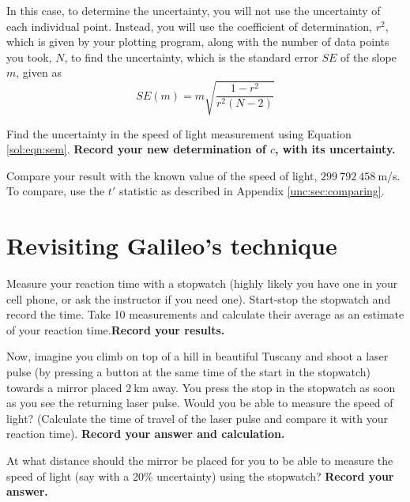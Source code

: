 In this case, to determine the uncertainty, you will not use the uncertainty of each individual point. Instead, you will use the coefficient of determination, $r^2$, which is given by your plotting program, along with the number of data points you took, $N$, to find the uncertainty, which is the standard error $SE$ of the slope $m$, given as
\begin{equation}\label{sol:eqn:sem}
SE(m) = m \sqrt{\frac{1-r^2}{r^2 (N-2)}}
\end{equation}

\begin{steps}

	\item Find the uncertainty in the speed of light measurement using Equation \ref{sol:eqn:sem}. \textbf{Record your new determination of $c$, with its uncertainty.}
	
	\item Compare your result with the known value of the speed of light, $299\:792\:458\:$m/s. To compare, use the $t'$ statistic as described in Appendix \ref{unc:sec:comparing}.

\end{steps}

\section{Revisiting Galileo's technique}

\begin{steps}
	
	\item Measure your reaction time with a stopwatch (highly likely you have one in your cell phone, or ask the instructor if you need one).  Start-stop the stopwatch and record the time. Take 10 measurements and calculate their average as an estimate of your reaction time.\textbf{Record your results.}
	
	\item Now, imagine you  climb on top of a hill in beautiful Tuscany and shoot a laser pulse (by pressing a button at the same time of the start in the stopwatch) towards a mirror placed $2\:$km away. You press the stop in the stopwatch as soon as you see the returning laser pulse. Would you be able to measure the speed of light? (Calculate the time of travel of the laser pulse and compare it with your reaction time). \textbf{Record your answer and calculation.}
	
	\item At what distance should the mirror be placed for you to be able to measure the speed of light (say with a 20\% uncertainty) using the stopwatch? \textbf{Record your answer.}

\end{steps}

